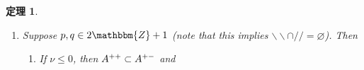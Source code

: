 \documentclass[12pt]{msjproc} %
\newcommand{\assign}{:=}
\newcommand{\tmop}[1]{\ensuremath{\operatorname{#1}}}
\newtheorem{theorem}{定理}
\begin{document}
\begin{versiona}
\begin{theorem}
\begin{enumerate}
\begin{enumerate}
      \begin{center}
        \begin{center}
          \begin{tabular}{|c|c|c|}
            \hline
            & $\nu \in 2\mathbbm{Z}$ & $\nu \in 2\mathbbm{Z}+ 1$\\
            \hline
            $(/ / \cup \backslash\backslash)^c$ & $\tmop{full}$ & $A^{+ -}$\\
            \hline
            $/ / \cap \backslash\backslash, k < l$ & $\tmop{full}$ &
            $\varnothing$\\
            \hline
            $/ / -\backslash\backslash$ & $\tmop{full}$ & $\varnothing$\\
            \hline
          \end{tabular}
        \end{center}
      \end{center}
      
      \item If $\nu > (p + q + 1) - 4$, then $A^{+ -} \cap A^{- +} =
      \varnothing$ and for $A^{- -} \assign \{ (a, b) \in \mathcal{I} | a + b
      \geqslant \nu - n + 3 \}$
      
      \begin{center}
        \begin{center}
          \begin{center}
            \begin{center}
              \begin{tabular}{|c|c|c|}
                \hline
                & $\nu \in 2\mathbbm{Z}$ & $\nu \in 2\mathbbm{Z}+ 1$\\
                \hline
                $(/ / \cup \backslash\backslash)^c$ & $\tmop{full}$ & $A^{+
                -}$\\
                \hline
                $/ / \cap \backslash\backslash, k < l$ & $A^{- -}$ &
                $\varnothing$\\
                \hline
                $/ / -\backslash\backslash$ & $\tmop{full}$ & $\varnothing$\\
                \hline
              \end{tabular}
            \end{center}
          \end{center}
          
          \ 
        \end{center}
      \end{center}
    \end{enumerate}
    \item Suppose $p, q \in 2\mathbbm{Z}+ 1$ (note that this implies
    $\backslash\backslash \cap / / = \varnothing$). Then
    \begin{enumerate}
      \item If $\nu \leqslant 0$, then $A^{ + +} \subset A^{+ -}$ and
      

\end{enumerate}
\end{enumerate}
\end{theorem}
\end{versiona}
\end{document}
